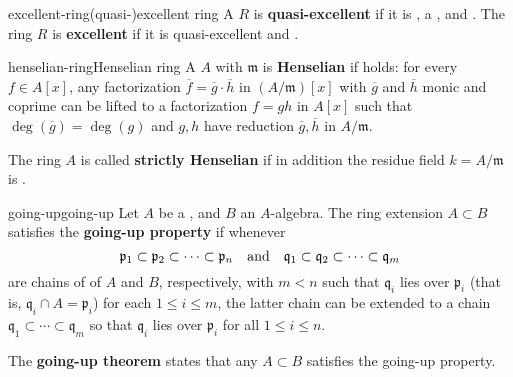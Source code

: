 \begin{topic}{excellent-ring}{(quasi-)excellent ring}
    A  $R$ is \textbf{quasi-excellent} if it is , a , and .
    The ring $R$ is \textbf{excellent} if it is quasi-excellent and .
\end{topic}

\begin{topic}{henselian-ring}{Henselian ring}
    A  $A$ with  $\mathfrak{m}$ is \textbf{Henselian} if  holds: for every  $f \in A[x]$, any factorization $\overline{f} = \overline{g} \cdot \overline{h}$ in $(A/\mathfrak{m})[x]$ with $\overline{g}$ and $\overline{h}$ monic and coprime can be lifted to a factorization $f = gh$ in $A[x]$ such that $\deg(\overline{g}) = \deg(g)$ and $g, h$ have reduction $\overline{g}, \overline{h}$ in $A/\mathfrak{m}$.
    
    The ring $A$ is called \textbf{strictly Henselian} if in addition the residue field $k = A/\mathfrak{m}$ is .
\end{topic}

\begin{topic}{going-up}{going-up}
    Let $A$ be a , and $B$ an $A$-algebra. The ring extension $A \subset B$ satisfies the \textbf{going-up property} if whenever
    \[ \mathfrak{p}_1 \subset \mathfrak{p}_2 \subset \cdots \subset \mathfrak{p}_n \quad \textup{and} \quad \mathfrak{q}_1 \subset \mathfrak{q}_2 \subset \cdots \subset \mathfrak{q}_m \]
    are chains of  of $A$ and $B$, respectively, with $m < n$ such that $\mathfrak{q}_i$ lies over $\mathfrak{p}_i$ (that is, $\mathfrak{q}_i \cap A = \mathfrak{p}_i$) for each $1 \le i \le m$, the latter chain can be extended to a chain $\mathfrak{q}_1 \subset \cdots \subset \mathfrak{q}_m$ so that $\mathfrak{q}_i$ lies over $\mathfrak{p}_i$ for all $1 \le i \le n$.
    
    The \textbf{going-up theorem} states that any  $A \subset B$ satisfies the going-up property.
\end{topic}

